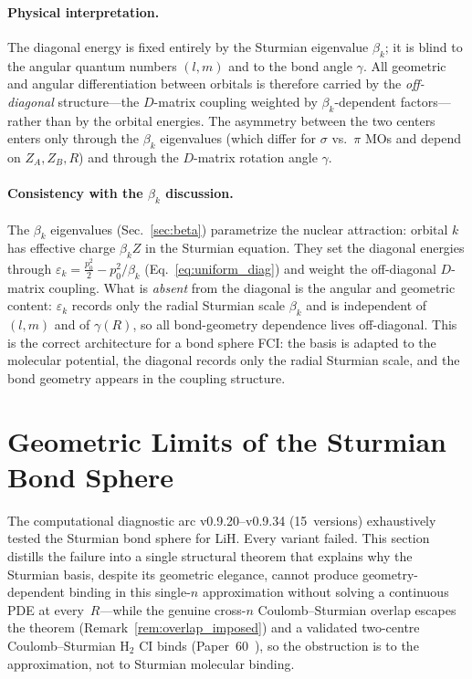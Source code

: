 \documentclass[aps,pra,twocolumn,superscriptaddress,longbibliography]{revtex4-2}
\theoremstyle{remark}
\theoremstyle{plain}
\begin{document}
\paragraph{Physical interpretation.}
The diagonal energy is fixed entirely by the Sturmian eigenvalue
$\beta_k$; it is blind to the angular quantum numbers $(l,m)$ and to the
bond angle $\gamma$.  All geometric and angular differentiation between
orbitals is therefore carried by the \emph{off-diagonal} structure---the
$D$-matrix coupling weighted by $\beta_k$-dependent factors---rather than
by the orbital energies.  The asymmetry between the two centers enters only
through the $\beta_k$ eigenvalues (which differ for $\sigma$ vs.\ $\pi$ MOs
and depend on $Z_A, Z_B, R$) and through the $D$-matrix rotation
angle $\gamma$.

\paragraph{Consistency with the $\beta_k$ discussion.}
The $\beta_k$ eigenvalues (Sec.~\ref{sec:beta}) parametrize the
nuclear attraction: orbital $k$ has effective charge $\beta_k Z$
in the Sturmian equation.  They set the diagonal energies through
$\varepsilon_k = \tfrac{p_0^2}{2} - p_0^2/\beta_k$
(Eq.~\eqref{eq:uniform_diag}) and weight the off-diagonal $D$-matrix
coupling.  What is \emph{absent} from the diagonal is the angular and
geometric content: $\varepsilon_k$ records only the radial Sturmian scale
$\beta_k$ and is independent of $(l,m)$ and of $\gamma(R)$, so all
bond-geometry dependence lives off-diagonal.  This is the correct
architecture for a bond sphere FCI: the basis is adapted to the molecular
potential, the diagonal records only the radial Sturmian scale, and the
bond geometry appears in the coupling structure.


\section{Geometric Limits of the Sturmian Bond Sphere}
\label{sec:structural_theorem}

The computational diagnostic arc v0.9.20--v0.9.34 (15~versions) exhaustively
tested the Sturmian bond sphere for LiH.  Every variant failed.  This section
distills the failure into a single structural theorem that explains why the
Sturmian basis, despite its geometric elegance, cannot produce
geometry-dependent binding in this single-$n$ approximation without solving a
continuous PDE at every~$R$---while the genuine cross-$n$ Coulomb--Sturmian
overlap escapes the theorem (Remark~\ref{rem:overlap_imposed}) and a
validated two-centre Coulomb--Sturmian H$_2$ CI binds
(Paper~60~\cite{loutey_paper60}), so the
obstruction is to the approximation, not to Sturmian molecular binding.
\end{document}
